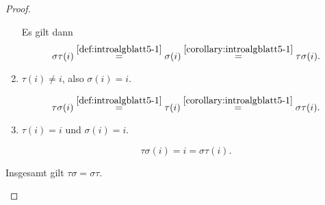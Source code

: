 \begin{proof}
\begin{parts}
\begin{enumerate}[label=(\roman*)]
				Es gilt dann
				\[
					\sigma\tau(i)\overset{\ref{def:introalgblatt5-1}}{=}\sigma(i)\overset{\ref{corollary:introalgblatt5-1}}{=}\tau\sigma(i)
				.\] 
			\item $\tau(i)\neq i$, also $\sigma(i)=i$.

				\[
					\tau\sigma(i)\overset{\ref{def:introalgblatt5-1}}{=}\tau(i)\overset{\ref{corollary:introalgblatt5-1}}{=}\sigma\tau(i)
				.\] 
			\item $\tau(i)=i$ und $\sigma(i)=i$.

				\[
				\tau\sigma(i)=i=\sigma\tau(i)
				.\] 
		\end{enumerate}
		Insgesamt gilt $\tau\sigma=\sigma\tau$.
	\end{parts}
\end{proof}
